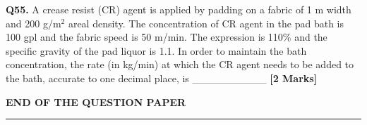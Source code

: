 \documentclass[11pt]{article}
\newcommand{\questionb}[2]{
    \noindent\textbf{Q#2.} #1 \hfill \textbf{[2 Marks]}
}
\begin{document}
\questionb{A crease resist (CR) agent is applied by padding on a fabric of 1 m width and 200 g/m\(^2\) areal density. The concentration of CR agent in the pad bath is 100 gpl and the fabric speed is 50 m/min. The expression is 110\% and the specific gravity of the pad liquor is 1.1. In order to maintain the bath concentration, the rate (in kg/min) at which the CR agent needs to be added to the bath, accurate to one decimal place, is \_\_\_\_\_\_\_\_\_\_}{55}
\vspace{0.5cm}

\vspace{5cm}
\begin{center}
\textbf{END OF THE QUESTION PAPER} \\
\rule{\textwidth}{0.5pt}
\end{center}
\end{document}
